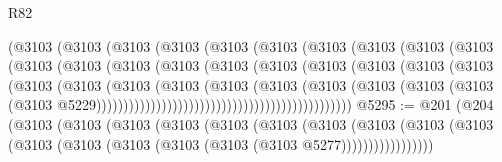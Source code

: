 \begin{lexlean}{R82}
\begin{coremodule}
                                    (@3103
                                      (@3103
                                        (@3103
                                          (@3103
                                            (@3103
                                              (@3103
                                                (@3103
                                                  (@3103
                                                    (@3103
                                                      (@3103
                                                        (@3103
                                                          (@3103
                                                            (@3103
                                                              (@3103
                                                                (@3103
                                                                  (@3103
                                                                    (@3103
                                                                      (@3103
                                                                        (@3103
                                                                          (@3103
                                                                            (@3103
                                                                              (@3103
                                                                                (@3103
                                                                                  (@3103
                                                                                    (@3103
                                                                                      (@3103
                                                                                        (@3103
                                                                                          (@3103
                                                                                            (@3103
                                                                                              (@3103
                                                                                                (@3103
                                                                                                  @5229)))))))))))))))))))))))))))))))))))))))))))))))
@5295 := @201
    (@204
      (@3103
        (@3103
          (@3103
            (@3103
              (@3103
                (@3103
                  (@3103
                    (@3103
                      (@3103 (@3103 (@3103 (@3103 (@3103 (@3103 (@3103 (@3103 @5277)))))))))))))))))

\end{coremodule}
\end{lexlean}
